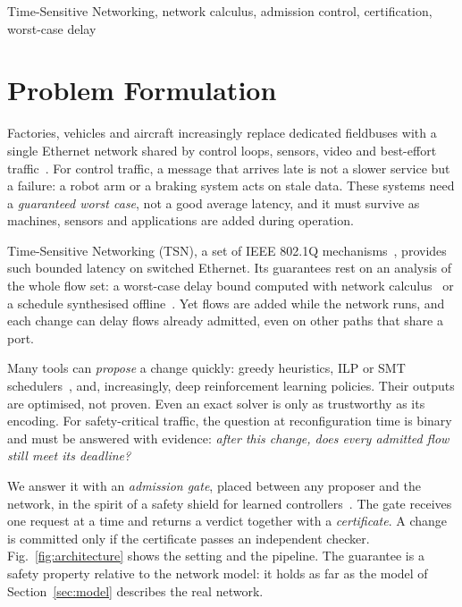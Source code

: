 \documentclass[conference]{IEEEtran}
\begin{document}
\begin{IEEEkeywords}
Time-Sensitive Networking, network calculus, admission control, certification, worst-case delay
\end{IEEEkeywords}

\section{Problem Formulation}
\label{sec:problem}

Factories, vehicles and aircraft increasingly replace dedicated fieldbuses with a single Ethernet network shared by control loops, sensors, video and best-effort traffic~\cite{lobello2019tsn,nasrallah2019ull}. For control traffic, a message that arrives late is not a slower service but a failure: a robot arm or a braking system acts on stale data. These systems need a \emph{guaranteed worst case}, not a good average latency, and it must survive as machines, sensors and applications are added during operation.

Time-Sensitive Networking (TSN), a set of IEEE 802.1Q mechanisms~\cite{ieee8021q}, provides such bounded latency on switched Ethernet. Its guarantees rest on an analysis of the whole flow set: a worst-case delay bound computed with network calculus~\cite{cruz1991calculus,leboudec2001nc} or a schedule synthesised offline~\cite{xue2024tsn}. Yet flows are added while the network runs, and each change can delay flows already admitted, even on other paths that share a port.

Many tools can \emph{propose} a change quickly: greedy heuristics, ILP or SMT schedulers~\cite{xue2024tsn}, and, increasingly, deep reinforcement learning policies. Their outputs are optimised, not proven. Even an exact solver is only as trustworthy as its encoding. For safety-critical traffic, the question at reconfiguration time is binary and must be answered with evidence: \emph{after this change, does every admitted flow still meet its deadline?}

We answer it with an \emph{admission gate}, placed between any proposer and the network, in the spirit of a safety shield for learned controllers~\cite{alshiekh2018shield}. The gate receives one request at a time and returns a verdict together with a \emph{certificate}. A change is committed only if the certificate passes an independent checker. Fig.~\ref{fig:architecture} shows the setting and the pipeline. The guarantee is a safety property relative to the network model: it holds as far as the model of Section~\ref{sec:model} describes the real network.
\end{document}
